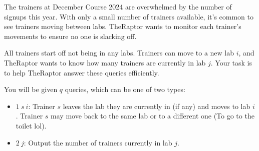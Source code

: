 The trainers at December Course 2024 are overwhelmed by the number of signups this year. With only a small number of trainers available, it's common to see trainers moving between labs. TheRaptor wants to monitor each trainer's movements to ensure no one is slacking off.

All trainers start off not being in any labs. Trainers can move to a new lab $i$, and TheRaptor wants to know how many trainers are currently in lab $j$. Your task is to help TheRaptor answer these queries efficiently.

You will be given $q$ queries, which can be one of two types:

\begin{itemize}
\item $1\ s\ i$: Trainer $s$ leaves the lab they are currently in (if any) and moves to lab $i$. Trainer $s$ may move back to the same lab or to a different one (To go to the toilet lol).

\item $2\ j$: Output the number of trainers currently in lab $j$.
\end{itemize}